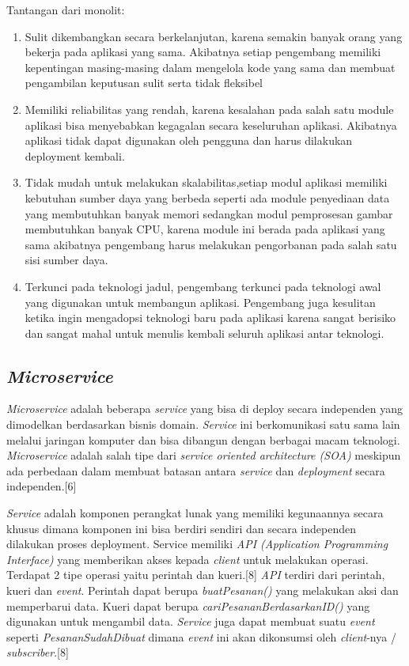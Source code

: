 Tantangan dari monolit:
\begin{enumerate}[leftmargin=1.3cm]
	\item Sulit dikembangkan secara berkelanjutan, karena semakin banyak orang yang bekerja pada aplikasi yang sama. Akibatnya setiap pengembang memiliki kepentingan masing-masing dalam mengelola kode yang sama dan membuat pengambilan keputusan sulit serta tidak fleksibel
	\item Memiliki reliabilitas yang rendah, karena kesalahan pada salah satu module aplikasi bisa menyebabkan kegagalan secara keseluruhan aplikasi. Akibatnya aplikasi tidak dapat digunakan oleh pengguna dan harus dilakukan deployment kembali.
	\item Tidak mudah untuk melakukan skalabilitas,setiap modul aplikasi memiliki kebutuhan sumber daya yang berbeda seperti ada module penyediaan data yang membutuhkan banyak memori sedangkan modul pemprosesan gambar membutuhkan banyak CPU, karena module ini berada pada aplikasi yang sama akibatnya pengembang harus melakukan pengorbanan pada salah satu sisi sumber daya.
	\item Terkunci pada teknologi jadul, pengembang terkunci pada teknologi awal yang digunakan untuk membangun aplikasi. Pengembang juga kesulitan ketika ingin mengadopsi teknologi baru pada aplikasi karena sangat berisiko dan sangat mahal untuk menulis kembali seluruh aplikasi antar teknologi.\\
\end{enumerate}	

\subsection{\textit{Microservice}}
\textit{Microservice} adalah beberapa \textit{service} yang bisa di deploy secara independen yang dimodelkan berdasarkan bisnis domain. \textit{Service} ini berkomunikasi satu sama lain melalui jaringan komputer dan bisa dibangun dengan berbagai macam teknologi. \textit{Microservice} adalah salah tipe dari \textit{service oriented architecture (SOA)} meskipun ada perbedaan dalam membuat batasan antara \textit{service} dan \textit{deployment} secara independen.[6]

\textit{Service} adalah komponen perangkat lunak yang memiliki kegunaannya secara khusus dimana komponen ini bisa berdiri sendiri dan secara independen dilakukan proses deployment. Service memiliki \textit{API (Application Programming Interface)} yang memberikan akses kepada \textit{client} untuk melakukan operasi. Terdapat 2 tipe operasi yaitu perintah dan kueri.[8]
\textit{API} terdiri dari perintah, kueri dan \textit{event}. Perintah dapat berupa \textit{buatPesanan()} yang melakukan aksi dan memperbarui data. Kueri dapat berupa \textit{cariPesananBerdasarkanID()} yang digunakan untuk mengambil data. \textit{Service} juga dapat membuat suatu \textit{event} seperti \textit{PesananSudahDibuat} dimana \textit{event} ini akan dikonsumsi oleh \textit{client}-nya / \textit{subscriber}.[8]

